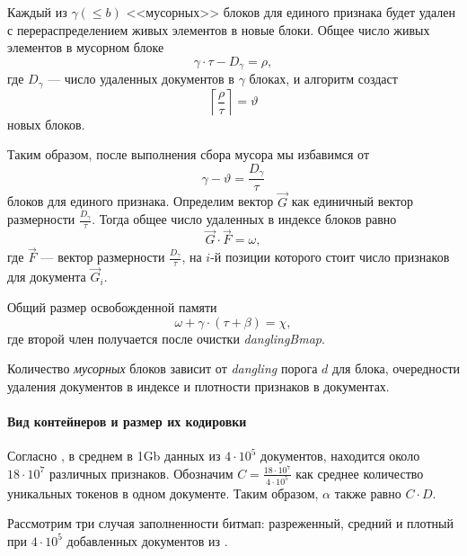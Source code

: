 Каждый из $\gamma (\leq b)$ <<мусорных>> блоков для единого признака будет удален с перераспределением живых
элементов в новые блоки. Общее число живых элементов в мусорном блоке 
\begin{equation}
    \gamma \cdot \tau - D_{\gamma} = \rho,
\end{equation}
где $D_{\gamma}$ — число удаленных документов в $\gamma$ блоках, и алгоритм создаст
\begin{equation}
    \left\lceil \frac{\rho}{\tau}\right\rceil = \vartheta 
\end{equation}
новых блоков.

Таким образом, после выполнения сбора мусора мы избавимся от 
\begin{equation}
    \gamma - \vartheta = \frac{D_{\gamma}}{\tau}
\end{equation}
блоков для единого признака. Определим вектор $\vec{G}$ как единичный вектор
размерности $\frac{D_{\gamma}}{\tau}$. Тогда общее число удаленных в индексе блоков равно
\begin{equation}
    \vec{G} \cdot \vec{F} = \omega,
\end{equation}
где $\vec{F}$ — вектор размерности $\frac{D_{\gamma}}{\tau}$, на $i$-й позиции которого
стоит число признаков для документа $\vec{G}_i$.

Общий размер освобожденной памяти
\begin{equation}
    \omega + \gamma \cdot \left(\tau + \beta\right) = \chi,
\end{equation}
где второй член получается после очистки \textit{danglingBmap}.

Количество \textit{мусорных} блоков зависит от \textit{dangling} порога $d$ для
блока, очередности удаления документов в индексе и плотности признаков в
документах.

\paragraph{Вид контейнеров и размер их кодировки}

Согласно \cite{Features:2020}, в среднем в 1Gb
данных из $4\cdot 10^5$ документов, находится около $18 \cdot 10^7$ различных
признаков. Обозначим $C = \frac{18 \cdot 10^7}{4\cdot 10^5}$ как среднее количество
уникальных токенов в одном документе. Таким образом, $\alpha$ также равно $C\cdot D$.

Рассмотрим три случая заполненности битмап: разреженный, средний и плотный
при $4 \cdot 10^5$ добавленных документов из \cite{Features:2020}.

